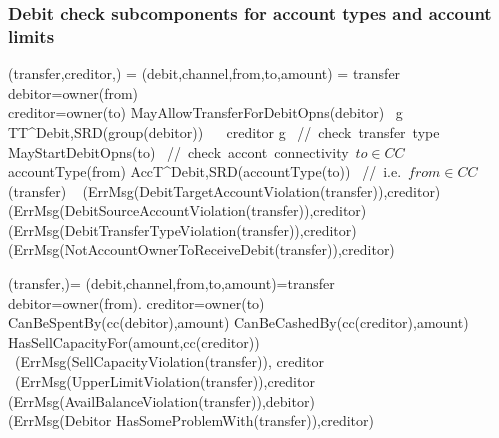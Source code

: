  \subsubsection{Debit check subcomponents for account types and account limits}
 \begin{asm}
 (transfer,creditor,)  =\+
	\LET (debit,channel,from,to,amount) = transfer \\
	\LET debitor=owner(from)\\
	\IF creditor=owner(to) \AND MayAllowTransferForDebitOpns(debitor) \THEN \+
		\IF~\FORSOME g \in TT^{Debit,SRD}(group(debitor))
 		~~ creditor \in g \THEN \mbox{  // check transfer type} \+
			\IF MayStartDebitOpns(to)    \mbox{  // check accont connectivity $to \in CC$} \THEN \+
				\IF accountType(from) \in AccT^{Debit,SRD}(accountType(to)) \THEN
				\mbox{ // i.e. $from \in CC$}\+
					(transfer) \-
				\ELSE ~ (ErrMsg(DebitTargetAccountViolation(transfer)),\TO creditor) \- 
			\ELSE ~ (ErrMsg(DebitSourceAccountViolation(transfer)),\TO creditor)  \-
		\ELSE ~ (ErrMsg(DebitTransferTypeViolation(transfer)),\TO creditor) \-
	\ELSE ~ (ErrMsg(NotAccountOwnerToReceiveDebit(transfer)),\TO creditor)
 \end{asm}

\begin{asm}
              (transfer,)= \+
              \LET (debit,channel,from,to,amount)=transfer \\
              \LET debitor=owner(from). creditor=owner(to)\\
              \IF CanBeSpentBy(cc(debitor),amount) \THEN \+
		\IF CanBeCashedBy(cc(creditor),amount) \THEN \+
			\IF HasSellCapacityFor(amount,cc(creditor)) \THEN \+
				 \-
			\ELSE~(ErrMsg(SellCapacityViolation(transfer)), \TO creditor\-
		\ELSE~(ErrMsg(UpperLimitViolation(transfer)),\TO creditor\-
	\ELSE \+
                 (ErrMsg(AvailBalanceViolation(transfer)),\TO debitor) \\
                 (ErrMsg(Debitor HasSomeProblemWith(transfer)),\TO creditor)
\end{asm}
  

